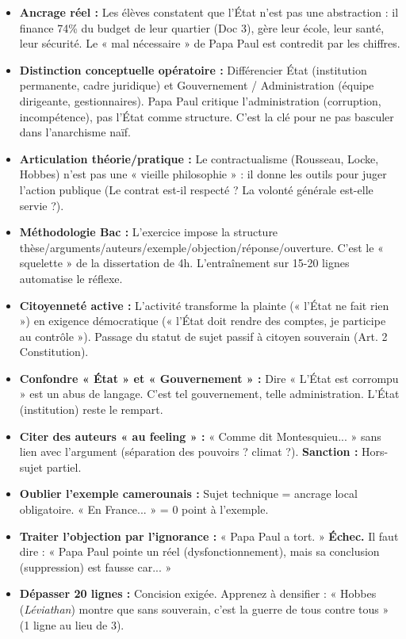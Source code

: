 \documentclass[11pt]{article}
\newcommand{\cle}[1]{{\popxbold\color{popdark}#1}}
\newcounter{popsec}
\newcounter{popsub}
\newcommand{\courssub}[1]{%
  \stepcounter{popsub}%
  \par\vspace{9pt}\noindent{\popxbold\fontsize{11.5}{13}\selectfont\color{popink}{\color{poporange}\thepopsec.\thepopsub}\hspace{6pt}#1}\par\nopagebreak\vspace{4pt}
}
\begin{document}
\courssub{Bilan de l'activité}
\begin{aretenir}
\begin{itemize}
    \item \textbf{Ancrage réel :} Les élèves constatent que l'État n'est pas une abstraction : il finance 74\% du budget de leur quartier (Doc 3), gère leur école, leur santé, leur sécurité. Le « mal nécessaire » de Papa Paul est contredit par les chiffres.
    \item \textbf{Distinction conceptuelle opératoire :} Différencier \cle{État} (institution permanente, cadre juridique) et \cle{Gouvernement / Administration} (équipe dirigeante, gestionnaires). Papa Paul critique l'administration (corruption, incompétence), pas l'État comme structure. C'est la clé pour ne pas basculer dans l'anarchisme naïf.
    \item \textbf{Articulation théorie/pratique :} Le contractualisme (Rousseau, Locke, Hobbes) n'est pas une « vieille philosophie » : il donne les outils pour juger l'action publique (Le contrat est-il respecté ? La volonté générale est-elle servie ?).
    \item \textbf{Méthodologie Bac :} L'exercice impose la structure thèse/arguments/auteurs/exemple/objection/réponse/ouverture. C'est le « squelette » de la dissertation de 4h. L'entraînement sur 15-20 lignes automatise le réflexe.
    \item \textbf{Citoyenneté active :} L'activité transforme la plainte (« l'État ne fait rien ») en exigence démocratique (« l'État doit rendre des comptes, je participe au contrôle »). Passage du statut de \cle{sujet} passif à \cle{citoyen} souverain (Art. 2 Constitution).
\end{itemize}
\end{aretenir}

\begin{attention}
\begin{itemize}
    \item \textbf{Confondre « État » et « Gouvernement » :} Dire « L'État est corrompu » est un abus de langage. C'est tel gouvernement, telle administration. L'État (institution) reste le rempart.
    \item \textbf{Citer des auteurs « au feeling » :} « Comme dit Montesquieu... » sans lien avec l'argument (séparation des pouvoirs ? climat ?). \textbf{Sanction :} Hors-sujet partiel.
    \item \textbf{Oublier l'exemple camerounais :} Sujet technique = ancrage local obligatoire. « En France... » = 0 point à l'exemple.
    \item \textbf{Traiter l'objection par l'ignorance :} « Papa Paul a tort. » \rightarrow \textbf{Échec.} Il faut dire : « Papa Paul pointe un réel (dysfonctionnement), mais sa conclusion (suppression) est fausse car... »
    \item \textbf{Dépasser 20 lignes :} Concision exigée. Apprenez à densifier : « Hobbes (\emph{Léviathan}) montre que sans souverain, c'est la guerre de tous contre tous » (1 ligne au lieu de 3).
\end{itemize}
\end{attention}
\end{document}
